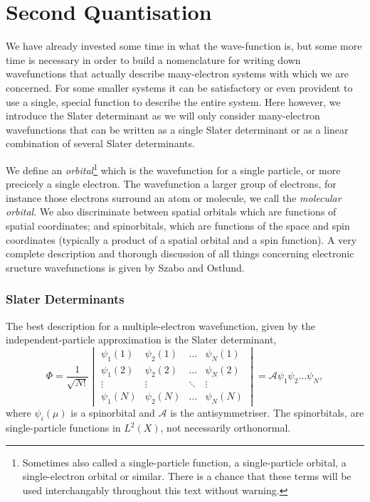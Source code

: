 \chapter{Second Quantisation}

We have already invested some time in what the wave-function is, but some more time 
is necessary in order to build a nomenclature for writing down wavefunctions that
actually describe many-electron systems with which we are concerned. For some smaller
systems it can be satisfactory or even provident to use a single, special function 
to describe the entire system. Here however, we introduce the Slater determinant as 
we will only consider many-electron wavefunctions that can be written as a single 
Slater determinant or as a linear combination of several Slater determinants.

We define an \emph{orbital}\footnote{Sometimes also called a single-particle function,
a single-particle orbital, a single-electron orbital or similar. There is a chance that 
these terms will be used interchangably throughout this text without warning.} which is the
wavefunction for a single particle, or more precicely a single electron. The wavefunction
a larger group of electrons, for instance those electrons surround an atom or molecule,
we call the \emph{molecular orbital}. We also discriminate between 
spatial orbitals which are functions of spatial coordinates; and spinorbitals, which 
are functions of the space and spin coordinates (typically a product of a spatial orbital
and a spin function). A very complete description and thorough discussion of all things 
concerning electronic sructure wavefunctions is given by Szabo and Ostlund\cite{szabo2012modern}. 

\subsection{Slater Determinants}

The best description for a multiple-electron wavefunction, given by the independent-particle
approximation is the Slater determinant,
\begin{equation}
    \label{eq:general_slater_determinant}
    \Phi = \frac{1}{\sqrt{N!}} \begin{vmatrix}
        \psi_1(1) & \psi_2(1) & \dots & \psi_N(1) \\
        \psi_1(2) & \psi_2(2) & \dots & \psi_N(2) \\
        \vdots & \vdots & \ddots & \vdots \\
        \psi_1(N) & \psi_2(N) & \dots & \psi_N(N)
    \end{vmatrix}
    = \mathscr{A}\psi_1 \psi_2 \dots \psi_N,
\end{equation}
where $\psi_i(\mu)$ is a spinorbital and $\mathscr{A}$ is the antisymmetriser. The
spinorbitals, are single-particle functions in $L^2(X)$, not necessarily orthonormal.

